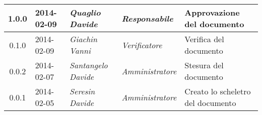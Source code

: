 \begin{small}
\begin{tabular}{|c|p{1.8cm}|p{2.8cm}|p{2.8cm}|p{3.5cm}|}
\hline
1.0.0 & 2014-02-09 & 
\textit{Quaglio Davide} &
\textit{Responsabile} &  Approvazione del documento\\
\hline
0.1.0 & 2014-02-09 & 
\textit{Giachin Vanni} &
\textit{Verificatore} &  Verifica del documento\\
\hline
0.0.2 & 2014-02-07 & 
\textit{Santangelo Davide} &
\textit{Amministratore} &  Stesura del documento\\
\hline
0.0.1 & 2014-02-05 & 
\textit{Seresin Davide} &
\textit{Amministratore} &  Creato lo scheletro del documento\\
\hline
\end{tabular}\\
\end{small}